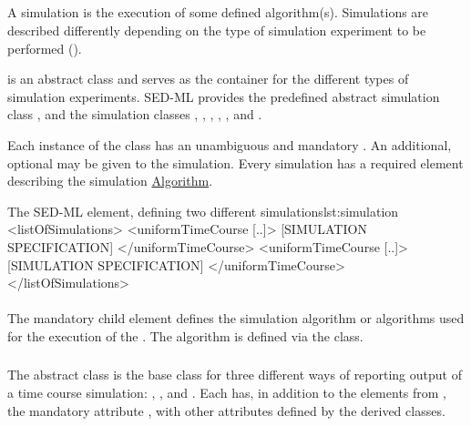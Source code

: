 \subsection{}
\label{class:simulation}
A simulation is the execution of some defined algorithm(s). Simulations are described differently depending on the type of simulation experiment to be performed (). 


\Simulation is an abstract class and serves as the container for the different types of simulation experiments. SED-ML \currentLV provides the predefined abstract simulation class \TimeCourse, and the simulation classes \UniformTimeCourse, \NonUniformTimeCourse, \SpecificTimeCourse, \OneStep, \SteadyState, and \Analysis. 

Each instance of the \Simulation class has an unambiguous and mandatory \hyperref[sec:id]{}. An additional, optional \hyperref[sec:name]{} may be given to the simulation. Every simulation has a required element \hyperref[class:algorithm]{} describing the simulation \hyperref[class:algorithm]{Algorithm}.

\begin{myXmlLst}{The SED-ML  element, defining two different \UniformTimeCourse simulations}{lst:simulation}
<listOfSimulations>
	<uniformTimeCourse [..]>
		[SIMULATION SPECIFICATION]
	</uniformTimeCourse>
	<uniformTimeCourse [..]>
		[SIMULATION SPECIFICATION]
	</uniformTimeCourse>
</listOfSimulations>
\end{myXmlLst}

\paragraph*{}
\label{sec:sim-algorithm}
The mandatory child  element defines the simulation algorithm or algorithms used for the execution of the \Simulation. The algorithm is defined via the \Algorithm class.

\begin{blockChanged}
\subsubsection{}
\label{class:timeCourse}
The abstract \TimeCourse class is the base class for three different ways of reporting output of a time course simulation: \UniformTimeCourse, \NonUniformTimeCourse, and \SpecificTimeCourse.  Each \TimeCourse has, in addition to the elements from \Simulation, the mandatory attribute \hyperref[sec:initialTime]{}, with other attributes defined by the derived classes.  
\end{blockChanged}


